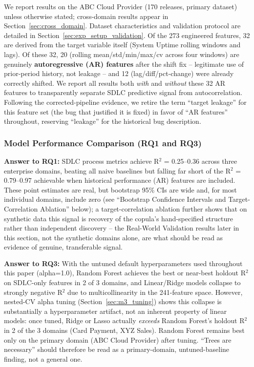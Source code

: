 \documentclass[technologies,article,submit,pdftex,moreauthors]{Definitions/mdpi}
\begin{document}
We report results on the ABC Cloud Provider (170 releases, primary
dataset) unless otherwise stated; cross-domain results appear in Section~\ref{sec:cross_domain}. Dataset characteristics and validation protocol are detailed in
Section~\ref{sec:exp_setup_validation}. Of the 273 engineered features, 32 are derived from the
target variable itself (System Uptime rolling windows and lags). Of
these 32, 20 (rolling mean/std/min/max/cv across four windows) are
genuinely \textbf{autoregressive (AR) features} after the shift fix --
legitimate use of prior-period history, not leakage -- and 12
(lag/diff/pct-change) were already correctly shifted. We report all
results both \emph{with} and \emph{without} these 32 AR features to
transparently separate SDLC predictive signal from autocorrelation.
Following the corrected-pipeline evidence, we retire the term ``target
leakage'' for this feature set (the bug that justified it is fixed) in
favor of ``AR features'' throughout, reserving ``leakage'' for the
historical bug description.

\subsubsection{Model Performance Comparison (RQ1 and
RQ3)}\label{sec:model_perf}

\textbf{Answer to RQ1:} SDLC process metrics achieve R\(^2\) =
0.25--0.36 across three enterprise domains, beating all naive baselines
but falling far short of the R\(^2\) = 0.79--0.97 achievable when
historical performance (AR) features are included. These point estimates
are real, but bootstrap 95\% CIs are wide and, for most individual
domains, include zero (see ``Bootstrap Confidence Intervals and
Target-Correlation Ablation'' below); a target-correlation ablation
further shows that on synthetic data this signal is recovery of the
copula's hand-specified structure rather than independent discovery --
the Real-World Validation results later in this section, not the
synthetic domains alone, are what should be read as evidence of genuine,
transferable signal.

\textbf{Answer to RQ3:} With the untuned default hyperparameters used
throughout this paper (alpha=1.0), Random Forest achieves the best or
near-best holdout R\(^2\) on SDLC-only features in 2 of 3 domains, and
Linear/Ridge models collapse to strongly negative R\(^2\) due to
multicollinearity in the 241-feature space. However, nested-CV alpha
tuning (Section~\ref{sec:m3_tuning}) shows this collapse is substantially a
hyperparameter artifact, not an inherent property of linear models: once
tuned, Ridge or Lasso actually \emph{exceeds} Random Forest's holdout
R\(^2\) in 2 of the 3 domains (Card Payment, XYZ Sales). Random Forest
remains best only on the primary domain (ABC Cloud Provider) after
tuning. ``Trees are necessary'' should therefore be read as a
primary-domain, untuned-baseline finding, not a general one.
\end{document}
